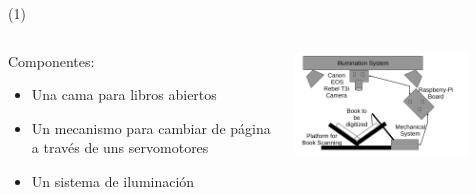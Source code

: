 



\begin{frame}{  \footnotemark (1)}
\begin{columns}
\begin{column}{0.4\textwidth}
		Componentes:
		\begin{itemize}
		\item Una cama para libros abiertos
		\item Un mecanismo para cambiar de página a través de uns servomotores
		\item Un sistema de iluminación 		
		\end{itemize}
\end{column}
\begin{column}{0.6\textwidth}  
    \begin{center}
     \includegraphics[width=0.8\textwidth]{Figs/BookScanner1}
     \end{center}
\end{column}
\end{columns}

\setcounter{footnote}{0}
\end{frame}


